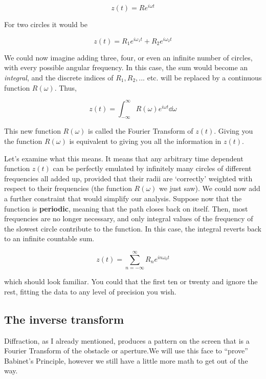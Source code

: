 \begin{equation*}
z(t) = R e^{i \omega t}
\end{equation*}

For two circles it would be 


\begin{equation*}
z(t) = R_1 e^{i \omega_1 t} + R_2 e^{i \omega_2 t}
\end{equation*}

We could now imagine adding three, four, or even an infinite number of circles, with every possible angular frequency. In this case, the sum would become an \textit{integral}, and the discrete indices of $R_1, R_2, ...$ etc. will be replaced by a continuous function $R(\omega)$. Thus,


\begin{equation*}
z(t) = \int^\infty_{-\infty} R(\omega) e^{i \omega t} \dd \omega
\end{equation*}

This new function $R(\omega)$ is called the Fourier Transform of $z(t)$. Giving you the function $R(\omega)$ is equivalent to giving you all the information in $z(t)$.

Let's examine what this means. It means that any arbitrary time dependent function $z(t)$ can be perfectly emulated by infinitely many circles of different frequencies all added up, provided that their radii are `correctly' weighted with respect to their frequencies (the function $R(\omega)$ we just saw). We could now add a further constraint that would simplify our analysis. Suppose now that the function is \textbf{periodic}, meaning that the path closes back on itself. Then, most frequencies  are no longer necessary, and only integral values of the frequency of the slowest circle contribute to the function. In this case, the integral reverts back to an infinite countable sum.


\begin{equation*}
z(t) = \sum_{n = -\infty}^\infty R_n e^{i n \omega_0 t}
\end{equation*}

which should look familiar. You could that the first ten or twenty and ignore the rest, fitting the data to any level of precision you wish.

\subsection{The inverse transform}

Diffraction, as I already mentioned, produces a pattern on the screen that is a Fourier Transform of the obstacle or aperture.We will use this face to ``prove'' Babinet's Principle, however we still have a little more math to get out of the way. 

